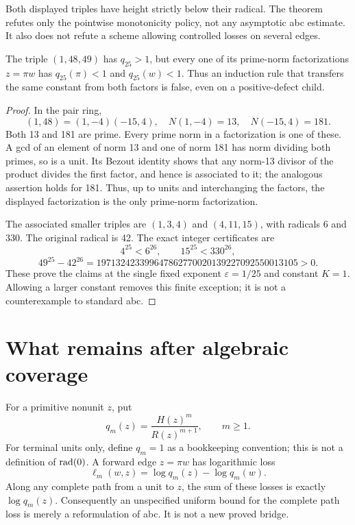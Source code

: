 Both displayed triples have height strictly below their radical. The theorem refutes only the pointwise monotonicity policy, not any asymptotic abc estimate. It also does not refute a scheme allowing controlled losses on several edges.

\begin{proposition}\label{eisenstein:prop:both}
The triple $(1,48,49)$ has $q_{25}>1$, but every one of its prime-norm factorizations $z=\pi w$ has $q_{25}(\pi)<1$ and $q_{25}(w)<1$. Thus an induction rule that transfers the same constant from both factors is false, even on a positive-defect child.
\end{proposition}
\begin{proof}
In the pair ring,
\[
(1,48)=(1,-4)(-15,4),\quad N(1,-4)=13,\quad N(-15,4)=181.
\]
Both 13 and 181 are prime. Every prime norm in a factorization is one of these. A gcd of an element of norm 13 and one of norm 181 has norm dividing both primes, so is a unit. Its Bezout identity shows that any norm-13 divisor of the product divides the first factor, and hence is associated to it; the analogous assertion holds for 181. Thus, up to units and interchanging the factors, the displayed factorization is the only prime-norm factorization.

The associated smaller triples are $(1,3,4)$ and $(4,11,15)$, with radicals 6 and 330. The original radical is 42. The exact integer certificates are
\[
4^{25}<6^{26},\qquad 15^{25}<330^{26},
\]
\[
49^{25}-42^{26}=197132423399647862770020139227092550013105>0.
\]
These prove the claims at the single fixed exponent $\varepsilon=1/25$ and constant $K=1$. Allowing a larger constant removes this finite exception; it is not a counterexample to standard abc.
\end{proof}

\section{What remains after algebraic coverage}
For a primitive nonunit $z$, put
\[
q_m(z)=\frac{H(z)^m}{R(z)^{m+1}},\qquad m\ge1.
\]
For terminal units only, define $q_m=1$ as a bookkeeping convention; this is not a definition of $\operatorname{rad}(0)$. A forward edge $z=\pi w$ has logarithmic loss
\[
\ell_m(w,z)=\log q_m(z)-\log q_m(w).
\]
Along any complete path from a unit to $z$, the sum of these losses is exactly $\log q_m(z)$. Consequently an unspecified uniform bound for the complete path loss is merely a reformulation of abc. It is not a new proved bridge.

